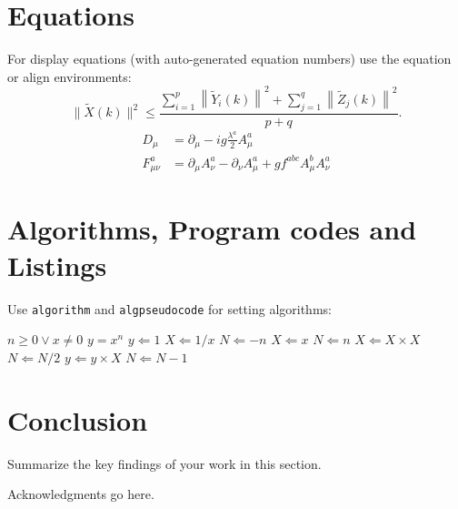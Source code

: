 \documentclass{svjour3}          %
\begin{document}
\section{Equations}\label{sec4}
For display equations (with auto-generated equation numbers) use the equation or align environments:
\begin{equation}
\|\tilde{X}(k)\|^2 \leq\frac{\sum\limits_{i=1}^{p}\left\|\tilde{Y}_i(k)\right\|^2+\sum\limits_{j=1}^{q}\left\|\tilde{Z}_j(k)\right\|^2 }{p+q}.\label{eq1}
\end{equation}
\begin{align}
D_\mu &=  \partial_\mu - ig \frac{\lambda^a}{2} A^a_\mu \nonumber \\
F^a_{\mu\nu} &= \partial_\mu A^a_\nu - \partial_\nu A^a_\mu + g f^{abc} A^b_\mu A^a_\nu \label{eq2}
\end{align}

\section{Algorithms, Program codes and Listings}\label{sec7}
Use \verb+algorithm+ and \verb+algpseudocode+ for setting algorithms:

\begin{algorithm}
\caption{Calculate $y = x^n$}\label{algo1}
\begin{algorithmic}[1]
\Require $n \geq 0 \vee x \neq 0$
\Ensure $y = x^n$ 
\State $y \Leftarrow 1$
    \State $X \Leftarrow 1 / x$
    \State $N \Leftarrow -n$
\Else
    \State $X \Leftarrow x$
    \State $N \Leftarrow n$
\EndIf
{}
        \State $X \Leftarrow X \times X$
        \State $N \Leftarrow N / 2$
    \Else
        \State $y \Leftarrow y \times X$
        \State $N \Leftarrow N - 1$
    \EndIf
\EndWhile
\end{algorithmic}
\end{algorithm}

\section{Conclusion}
\label{conclusion}
Summarize the key findings of your work in this section.
\lipsum[9]

\begin{acknowledgements}
Acknowledgments go here.
\end{acknowledgements}


\end{document}
